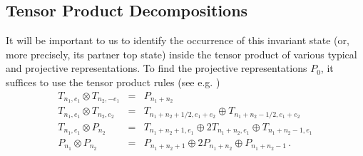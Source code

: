 \documentclass[12pt]{article}
\numberwithin{equation}{section}
\numberwithin{equation}{section}
\numberwithin{table}{section}\setlength{\multlinegap}{25pt}
\begin{document}
\subsection{Tensor Product Decompositions}
It will be important to
us to identify the occurrence of this invariant state (or, more precisely, its partner top state)
inside the tensor product of various typical and projective representations.
To find the projective representations $P_0$, it suffices to use the 
tensor product rules (see e.g. \cite{Creutzig:2011np})
\begin{eqnarray}
T_{n_1,e_1} \otimes T_{n_2,-e_1} &=& P_{n_1+n_2}
\nonumber \\
T_{n_1,e_1} \otimes T_{n_2,e_2} &=& T_{n_1+n_2+1/2,e_1+e_2} \oplus T_{n_1+n_2-1/2,e_1+e_2}
\nonumber \\
T_{n_1,e_1} \otimes P_{n_2} &=& T_{n_1+n_2+1,e_1} \oplus 2 T_{n_1+n_2,e_1} \oplus T_{n_1+n_2-1,e_1}
\nonumber \\
P_{n_1} \otimes P_{n_2} &=& P_{n_1+n_2+1} \oplus 2 P_{n_1+n_2} \oplus P_{n_1+n_2-1} \, .
\end{eqnarray}
\end{document}
